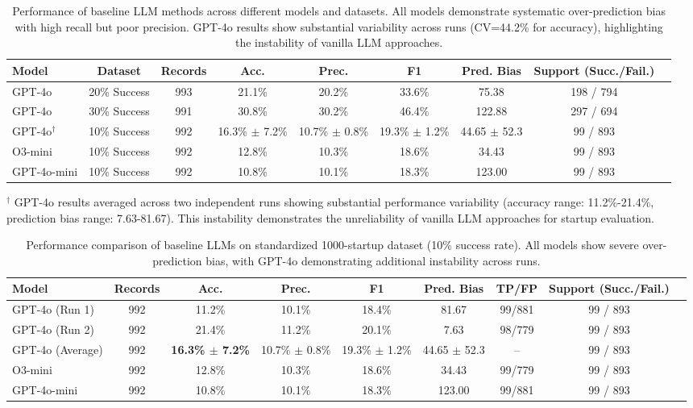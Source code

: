 \begin{table}[H]
\centering
\caption{Performance of baseline LLM methods across different models and datasets. All models demonstrate systematic over-prediction bias with high recall but poor precision. GPT-4o results show substantial variability across runs (CV=44.2\% for accuracy), highlighting the instability of vanilla LLM approaches.}
\label{tab:baseline_llm}
\begin{tabular}{lcccccccc}
\toprule
Model & Dataset & Records & Acc. & Prec. & F1 & Pred. Bias & Support (Succ./Fail.) \\
\midrule
GPT-4o & 20\% Success & 993 & 21.1\% & 20.2\% & 33.6\% & 75.38 & 198 / 794 \\
GPT-4o & 30\% Success & 991 & 30.8\% & 30.2\% & 46.4\% & 122.88 & 297 / 694 \\
GPT-4o$^{\dagger}$ & 10\% Success & 992 & 16.3\% $\pm$ 7.2\% & 10.7\% $\pm$ 0.8\% & 19.3\% $\pm$ 1.2\% & 44.65 $\pm$ 52.3 & 99 / 893 \\
O3-mini & 10\% Success & 992 & 12.8\% & 10.3\% & 18.6\% & 34.43 & 99 / 893 \\
GPT-4o-mini & 10\% Success & 992 & 10.8\% & 10.1\% & 18.3\% & 123.00 & 99 / 893 \\
\bottomrule
\end{tabular}
\end{table}

$^{\dagger}$ GPT-4o results averaged across two independent runs showing substantial performance variability (accuracy range: 11.2\%-21.4\%, prediction bias range: 7.63-81.67). This instability demonstrates the unreliability of vanilla LLM approaches for startup evaluation.

\begin{table}[H]
\centering
\caption{Performance comparison of baseline LLMs on standardized 1000-startup dataset (10\% success rate). All models show severe over-prediction bias, with GPT-4o demonstrating additional instability across runs.}
\label{tab:baseline_llm_1000}
\begin{tabular}{lcccccccc}
\toprule
Model & Records & Acc. & Prec. & F1 & Pred. Bias & TP/FP & Support (Succ./Fail.) \\
\midrule
GPT-4o (Run 1) & 992 & 11.2\% & 10.1\% & 18.4\% & 81.67 & 99/881 & 99 / 893 \\
GPT-4o (Run 2) & 992 & 21.4\% & 11.2\% & 20.1\% & 7.63 & 98/779 & 99 / 893 \\
\hdashline
GPT-4o (Average) & 992 & \textbf{16.3\% $\pm$ 7.2\%} & 10.7\% $\pm$ 0.8\% & 19.3\% $\pm$ 1.2\% & 44.65 $\pm$ 52.3 & -- & 99 / 893 \\
\midrule
O3-mini & 992 & 12.8\% & 10.3\% & 18.6\% & 34.43 & 99/779 & 99 / 893 \\
GPT-4o-mini & 992 & 10.8\% & 10.1\% & 18.3\% & 123.00 & 99/881 & 99 / 893 \\
\bottomrule
\end{tabular}
\end{table} 